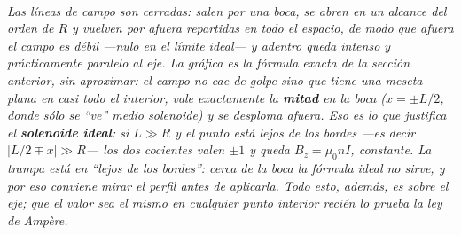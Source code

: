 \begin{center}
\\[0.5em]
{\small\itshape Las líneas de campo son cerradas: salen por una boca, se abren
en un alcance del orden de $R$ y vuelven por afuera repartidas en todo el
espacio, de modo que afuera el campo es débil ---nulo en el límite ideal--- y
adentro queda intenso y prácticamente paralelo al eje. La gráfica es la fórmula
exacta de la sección anterior, sin aproximar: el campo no cae de golpe sino que
tiene una meseta plana en casi todo el interior, vale exactamente la
\textbf{mitad} en la boca ($x=\pm L/2$, donde sólo se ``ve'' medio solenoide) y
se desploma afuera. Eso es lo que justifica el \textbf{solenoide ideal}: si
$L\gg R$ y el punto está lejos de los bordes ---es decir $|L/2\mp x|\gg R$---
los dos cocientes valen $\pm 1$ y queda $B_z = \mu_0 n I$, constante. La trampa
está en ``lejos de los bordes'': cerca de la boca la fórmula ideal no sirve, y
por eso conviene mirar el perfil antes de aplicarla. Todo esto, además, es sobre
el eje; que el valor sea el mismo en \emph{cualquier} punto interior recién lo
prueba la ley de Ampère.}
\end{center}
